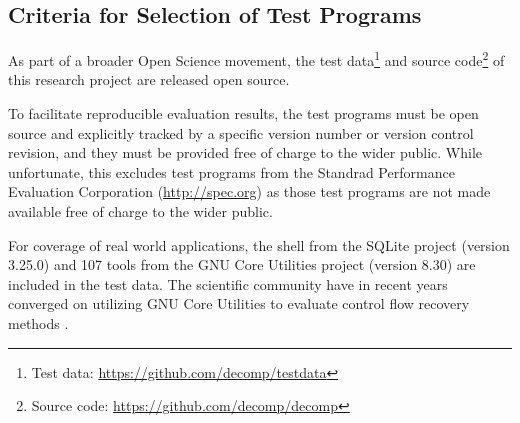 
\subsection{Criteria for Selection of Test Programs}
\label{sec:criteria_for_selection_of_test_programs}

As part of a broader Open Science movement, the test data\footnote{Test data: \url{https://github.com/decomp/testdata}} and source code\footnote{Source code: \url{https://github.com/decomp/decomp}} of this research project are released open source.

To facilitate reproducible evaluation results, the test programs must be open source and explicitly tracked by a specific version number or version control revision, and they must be provided free of charge to the wider public. While unfortunate, this excludes test programs from the Standrad Performance Evaluation Corporation (\url{http://spec.org}) as those test programs are not made available free of charge to the wider public.


For coverage of real world applications, the shell from the SQLite project (version 3.25.0) and 107 tools from the GNU Core Utilities project (version 8.30) are included in the test data. The scientific community have in recent years converged on utilizing GNU Core Utilities to evaluate control flow recovery methods \cite{no_more_gotos,homan_centric_decompilation,interprocedural_control_flow_recovery,semantics_preserving_structural_analysis,revng}.



